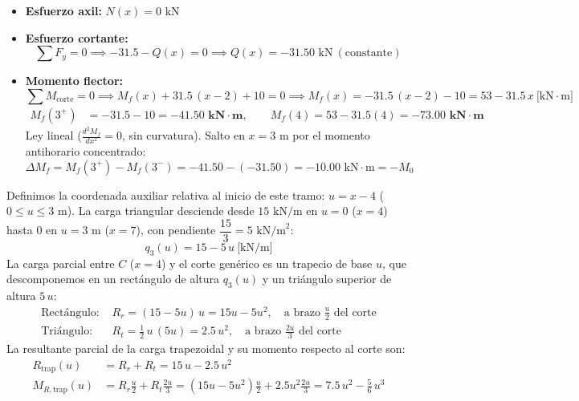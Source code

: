 \begin{itemize}
    \item \textbf{Esfuerzo axil:} $\boxed{N(x) = 0\text{ kN}}$
    \item \textbf{Esfuerzo cortante:}
          \begin{equation}
              \sum F_y = 0 \implies -31.5 - Q(x) = 0 \implies \boxed{Q(x) = -31.50\text{ kN}} \ (\text{constante})
          \end{equation}
    \item \textbf{Momento flector:}
          \begin{equation}
              \sum M_{\text{corte}} = 0 \implies M_f(x) + 31.5\,(x - 2) + 10 = 0 \implies \boxed{M_f(x) = -31.5\,(x-2) - 10 = 53 - 31.5\,x \ \text{[kN}\cdot\text{m]}}
          \end{equation}
          \begin{align*}
              M_f(3^+) & = -31.5 - 10 = \mathbf{-41.50\text{ kN}\cdot\text{m}}, \qquad M_f(4) = 53 - 31.5(4) = \mathbf{-73.00\text{ kN}\cdot\text{m}}
          \end{align*}
          Ley lineal ($\tfrac{d^2M_f}{dx^2} = 0$, sin curvatura). Salto en $x = 3\text{ m}$ por el momento antihorario concentrado:
          \begin{equation}
              \Delta M_f = M_f(3^+) - M_f(3^-) = -41.50 - (-31.50) = -10.00\text{ kN}\cdot\text{m} = -M_0
          \end{equation}
\end{itemize}


Definimos la coordenada auxiliar relativa al inicio de este tramo: $u = x - 4$ ($0 \le u \le 3\text{ m}$).
La carga triangular desciende desde $15\text{ kN/m}$ en $u=0$ ($x=4$) hasta $0$ en $u=3\text{ m}$ ($x=7$), con pendiente $\dfrac{15}{3} = 5\text{ kN/m}^2$:
\begin{equation}
    q_3(u) = 15 - 5\,u \ \text{[kN/m]}
\end{equation}
La carga parcial entre $C$ ($x=4$) y el corte genérico es un trapecio de base $u$, que descomponemos en un rectángulo de altura $q_3(u)$ y un triángulo superior de altura $5\,u$:
\begin{align*}
    \text{Rectángulo: } & R_r = (15 - 5u)\,u = 15u - 5u^2, \quad \text{a brazo } \tfrac{u}{2} \text{ del corte}        \\[4pt]
    \text{Triángulo: }  & R_t = \frac{1}{2}\,u\,(5u) = 2.5\,u^2, \quad \text{a brazo } \tfrac{2u}{3} \text{ del corte}
\end{align*}
La resultante parcial de la carga trapezoidal y su momento respecto al corte son:
\begin{align}
    R_{\text{trap}}(u)   & = R_r + R_t = 15\,u - 2.5\,u^2                                                                                   \\[4pt]
    M_{R,\text{trap}}(u) & = R_r\frac{u}{2} + R_t\frac{2u}{3} = (15u - 5u^2)\frac{u}{2} + 2.5u^2\frac{2u}{3} = 7.5\,u^2 - \frac{5}{6}\,u^3
\end{align}

